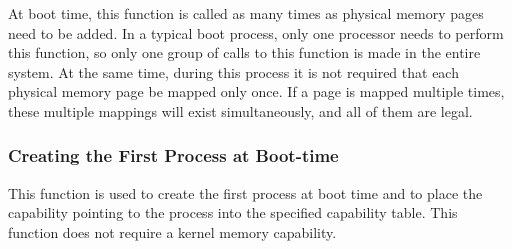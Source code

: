 At boot time, this function is called as many times as physical memory pages need to be added. In a typical boot process, only one processor needs to perform this function, so only one group of calls to this function is made in the entire system. At the same time, during this process it is not required that each physical memory page be mapped only once. If a page is mapped multiple times, these multiple mappings will exist simultaneously, and all of them are legal.

\subsubsection{Creating the First Process at Boot-time}\label{subsubsec:7-create-first-process-at-boot}

This function is used to create the first process at boot time and to place the capability pointing to the process into the specified capability table. This function does not require a kernel memory capability.

